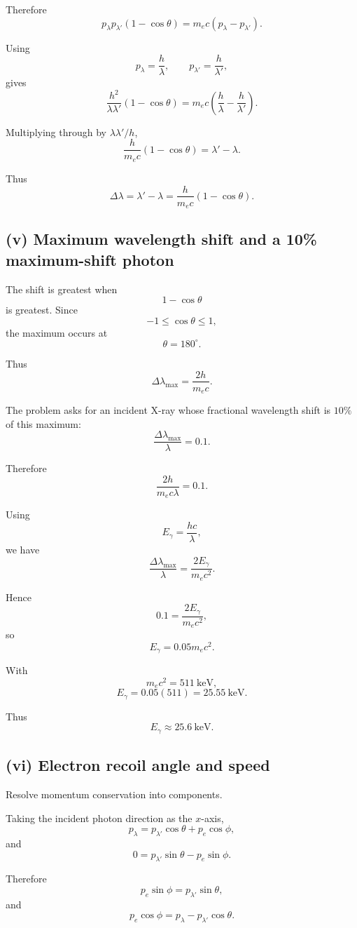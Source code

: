 \documentclass[11pt,a4paper]{article}
\begin{document}
Therefore
\[
p_\lambda p_{\lambda'}(1-\cos\theta)
=
m_ec(p_\lambda-p_{\lambda'}).
\]

Using
\[
p_\lambda=\frac h\lambda,
\qquad
p_{\lambda'}=\frac h{\lambda'},
\]
gives
\[
\frac{h^2}{\lambda\lambda'}(1-\cos\theta)
=
m_ec
\left(
\frac h\lambda-\frac h{\lambda'}
\right).
\]

Multiplying through by $\lambda\lambda'/h$,
\[
\frac h{m_ec}(1-\cos\theta)
=
\lambda'-\lambda.
\]

Thus
\[
\boxed{
\Delta\lambda
=
\lambda'-\lambda
=
\frac h{m_ec}(1-\cos\theta)
}.
\]

\subsection{(v) Maximum wavelength shift and a 10\% maximum-shift photon}

The shift is greatest when
\[
1-\cos\theta
\]
is greatest. Since
\[
-1\le\cos\theta\le1,
\]
the maximum occurs at
\[
\boxed{\theta=180^\circ}.
\]

Thus
\[
\Delta\lambda_{\max}
=
\frac{2h}{m_ec}.
\]

The problem asks for an incident X-ray whose fractional wavelength shift is
$10\%$ of this maximum:
\[
\frac{\Delta\lambda_{\max}}{\lambda}=0.1.
\]

Therefore
\[
\frac{2h}{m_ec\lambda}=0.1.
\]

Using
\[
E_\gamma=\frac{hc}{\lambda},
\]
we have
\[
\frac{\Delta\lambda_{\max}}{\lambda}
=
\frac{2E_\gamma}{m_ec^2}.
\]

Hence
\[
0.1=\frac{2E_\gamma}{m_ec^2},
\]
so
\[
E_\gamma
=
0.05m_ec^2.
\]

With
\[
m_ec^2=511\ \mathrm{keV},
\]
\[
E_\gamma
=
0.05(511)
=
25.55\ \mathrm{keV}.
\]

Thus
\[
\boxed{E_\gamma\approx25.6\ \mathrm{keV}}.
\]

\subsection{(vi) Electron recoil angle and speed}

Resolve momentum conservation into components.

Taking the incident photon direction as the $x$-axis,
\[
p_\lambda
=
p_{\lambda'}\cos\theta+p_e\cos\phi,
\]
and
\[
0
=
p_{\lambda'}\sin\theta-p_e\sin\phi.
\]

Therefore
\[
p_e\sin\phi
=
p_{\lambda'}\sin\theta,
\]
and
\[
p_e\cos\phi
=
p_\lambda-p_{\lambda'}\cos\theta.
\]
\end{document}

